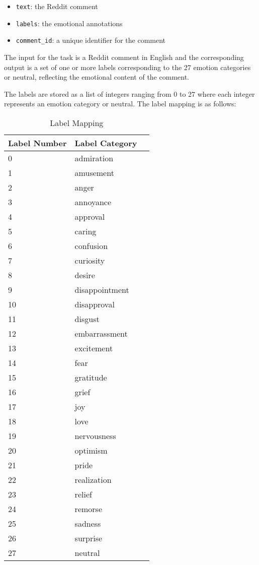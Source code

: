 \documentclass[titlepage]{article}
\begin{document}
\begin{itemize}
    \item \texttt{text}: the Reddit comment
    \item \texttt{labels}: the emotional annotations
    \item \texttt{comment\_id}: a unique identifier for the comment
\end{itemize}

The input for the task is a Reddit comment in English and the corresponding output is a set of one or more labels corresponding 
to the 27 emotion categories or neutral, reflecting the emotional content of the comment.

The labels are stored as a list of integers ranging from 0 to 27 where each integer represents an emotion category or neutral. The 
label mapping is as follows:

\begin{table}[H] \label{tab:labels}
    \centering
    \begin{tabular}{lll}
    \toprule
    \textbf{Label Number} & \textbf{Label Category} \\
    \midrule
    0 & admiration \\
    1 & amusement \\
    2 & anger \\
    3 & annoyance \\
    4 & approval \\
    5 & caring \\ 
    6 & confusion \\
    7 & curiosity \\
    8 & desire \\
    9 & disappointment \\
    10 & disapproval \\
    11 & disgust \\
    12 & embarrassment \\
    13 & excitement \\
    14 & fear \\
    15 & gratitude \\
    16 & grief \\
    17 & joy \\
    18 & love \\
    19 & nervousness \\
    20 & optimism \\
    21 & pride \\
    22 & realization \\
    23 & relief \\
    24 & remorse \\
    25 & sadness \\
    26 & surprise \\
    27 & neutral \\
    \bottomrule
    \end{tabular}
    \caption{Label Mapping}
\end{table}
\end{document}
